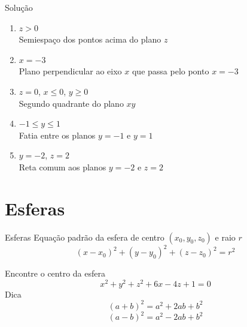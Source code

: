\begin{resolution}{Solução}
  \begin{enumerate}[<+->]
    \item \(z > 0\) \\
          Semiespaço dos pontos acima do plano $z$
    \item \(x = -3\) \\
          Plano perpendicular ao eixo $x$ que passa pelo ponto $x=-3$
    \item \(z=0\), \(x\leq 0\), \(y\geq 0\) \\
          Segundo quadrante do plano $xy$
    \item \(-1\leq y \leq 1\) \\
          Fatia entre os planos \(y=-1\) e \(y=1\)
    \item \(y=-2\), \(z=2\) \\
          Reta comum aos planos \(y=-2\) e \(z=2\)
  \end{enumerate}
\end{resolution}

\section{Esferas}

\begin{frame}{Esferas}
  Equação padrão da esfera de centro \((x_0, y_0, z_0)\) e raio \(r\)
  \[
    \left(x-x_0\right)^2 + \left(y-y_0\right)^2 + \left(z-z_0\right)^2 = r^2
  \]
\end{frame}

\begin{question}
  Encontre o centro da esfera
  \[
    x^2 + y^2 + z^2 + 6x - 4z + 1 = 0
  \]
  \pause
  Dica
  \[
    (a+b)^2 = a^2 + 2ab + b^2
  \]
  \[
    (a-b)^2 = a^2 - 2ab + b^2
  \]
\end{question}


